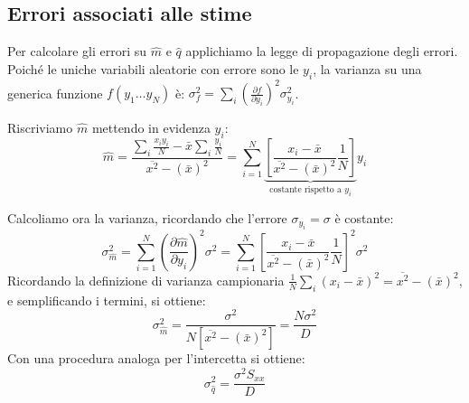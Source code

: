 \documentclass[openany,a4paper,12pt]{book}
\theoremstyle{remark}
\begin{document}
\subsection*{Errori associati alle stime}
Per calcolare gli errori su $\hat{m}$ e $\hat{q}$ applichiamo la legge di propagazione degli errori. Poiché le uniche variabili aleatorie con errore sono le $y_i$, la varianza su una generica funzione $f(y_1 \dots y_N)$ è: $\sigma_f^2 = \sum_i \left( \frac{\partial f}{\partial y_i} \right)^2 \sigma_{y_i}^2$.

Riscriviamo $\hat{m}$ mettendo in evidenza $y_i$:
\begin{equation*}
    \hat{m} = \frac{\sum_i \frac{x_i y_i}{N} - \bar{x} \sum_i \frac{y_i}{N}}{\overline{x^2} - (\bar{x})^2} = \sum_{i=1}^N \underbrace{\left[ \frac{x_i - \bar{x}}{\overline{x^2} - (\bar{x})^2} \frac{1}{N} \right]}_{\text{costante rispetto a } y_i} y_i
\end{equation*}

Calcoliamo ora la varianza, ricordando che l'errore $\sigma_{y_i} = \sigma$ è costante:
\begin{equation}
    \sigma_{\hat{m}}^2 = \sum_{i=1}^N \left(\frac{\partial \hat{m}}{\partial y_i}\right)^2 \sigma^2 = \sum_{i=1}^N \left[ \frac{x_i - \bar{x}}{\overline{x^2} - (\bar{x})^2} \frac{1}{N} \right]^2 \sigma^2
\end{equation}
Ricordando la definizione di varianza campionaria $\frac{1}{N} \sum_i (x_i - \bar{x})^2 = \overline{x^2} - (\bar{x})^2$, e semplificando i termini, si ottiene:
\begin{equation}
    \sigma_{\hat{m}}^2 = \frac{\sigma^2}{N[\overline{x^2} - (\bar{x})^2]} = \frac{N \sigma^2}{D}
\end{equation}
Con una procedura analoga per l'intercetta si ottiene:
\begin{equation}
    \sigma_{\hat{q}}^2 = \frac{\sigma^2 S_{xx}}{D}
\end{equation}
\end{document}

